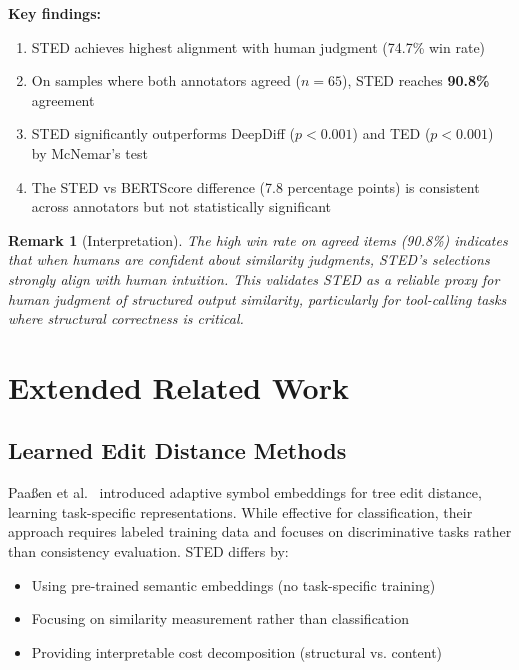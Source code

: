 \documentclass{article}
\newtheorem{remark}[theorem]{Remark}
\begin{document}
\textbf{Key findings:}
\begin{enumerate}
    \item STED achieves highest alignment with human judgment (74.7\% win rate)
    \item On samples where both annotators agreed ($n=65$), STED reaches \textbf{90.8\%} agreement
    \item STED significantly outperforms DeepDiff ($p < 0.001$) and TED ($p < 0.001$) by McNemar's test
    \item The STED vs BERTScore difference (7.8 percentage points) is consistent across annotators but not statistically significant
\end{enumerate}

\begin{remark}[Interpretation]
The high win rate on agreed items (90.8\%) indicates that when humans are confident about similarity judgments, STED's selections strongly align with human intuition. This validates STED as a reliable proxy for human judgment of structured output similarity, particularly for tool-calling tasks where structural correctness is critical.
\end{remark}

\section{Extended Related Work}


\subsection{Learned Edit Distance Methods}

Paaßen et al.~\cite{paassen2018tree} introduced adaptive symbol embeddings for tree edit distance, learning task-specific representations. While effective for classification, their approach requires labeled training data and focuses on discriminative tasks rather than consistency evaluation. STED differs by:
\begin{itemize}
    \item Using pre-trained semantic embeddings (no task-specific training)
    \item Focusing on similarity measurement rather than classification
    \item Providing interpretable cost decomposition (structural vs. content)
\end{itemize}
\end{document}
